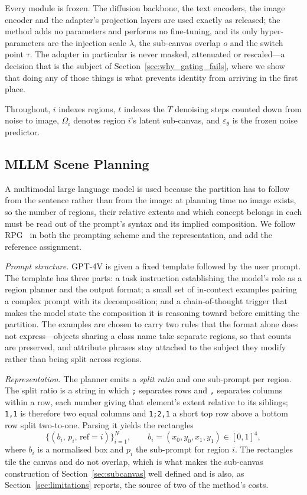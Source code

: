 \documentclass[10pt,twocolumn,letterpaper]{article}
\begin{document}
Every module is frozen.  The diffusion backbone, the text encoders, the image
encoder and the adapter's projection layers are used exactly as released; the
method adds no parameters and performs no fine-tuning, and its only
hyper-parameters are the injection scale $\lambda$, the sub-canvas overlap
$o$ and the switch point $\tau$.  The adapter in particular is never masked,
attenuated or rescaled---a decision that is the subject of
Section~\ref{sec:why_gating_fails}, where we show that doing any of those
things is what prevents identity from arriving in the first place.

Throughout, $i$ indexes regions, $t$ indexes the $T$ denoising steps counted
down from noise to image, $\Omega_i$ denotes region $i$'s latent sub-canvas,
and $\varepsilon_\theta$ is the frozen noise predictor.

\subsection{MLLM Scene Planning}
\label{sec:planning}

A multimodal large language model is used because the partition has to follow
from the sentence rather than from the image: at planning time no image
exists, so the number of regions, their relative extents and which concept
belongs in each must be read out of the prompt's syntax and its implied
composition.  We follow RPG~\cite{yang2024mastering} in both the prompting
scheme and the representation, and add the reference assignment.

\noindent\textit{Prompt structure.}
GPT-4V is given a fixed template followed by the user prompt.  The template
has three parts: a task instruction establishing the model's role as a region
planner and the output format; a small set of in-context examples pairing a
complex prompt with its decomposition; and a chain-of-thought trigger that
makes the model state the composition it is reasoning toward before emitting
the partition.  The examples are chosen to carry two rules that the format
alone does not express---objects sharing a class name take separate regions,
so that counts are preserved, and attribute phrases stay attached to the
subject they modify rather than being split across regions.

\noindent\textit{Representation.}
The planner emits a \emph{split ratio} and one sub-prompt per region.  The
split ratio is a string in which \texttt{;} separates rows and \texttt{,}
separates columns within a row, each number giving that element's extent
relative to its siblings; \texttt{1,1} is therefore two equal columns and
\texttt{1;2,1} a short top row above a bottom row split two-to-one.  Parsing
it yields the rectangles
\begin{equation}
  \bigl\{(b_i,\, p_i,\, \mathrm{ref}{=}i)\bigr\}_{i=1}^{N},
  \qquad b_i=(x_0,y_0,x_1,y_1)\in[0,1]^4 ,
\end{equation}
where $b_i$ is a normalised box and $p_i$ the sub-prompt for region $i$.  The
rectangles tile the canvas and do not overlap, which is what makes the
sub-canvas construction of Section~\ref{sec:subcanvas} well defined and is
also, as Section~\ref{sec:limitations} reports, the source of two of the
method's costs.
\end{document}
